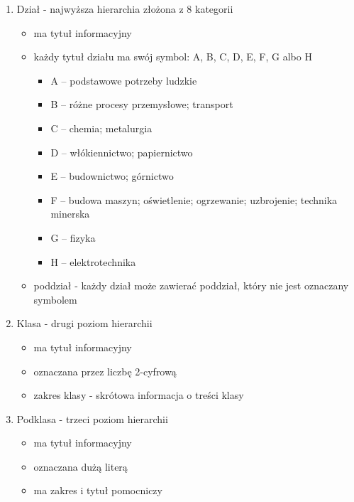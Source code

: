   \begin{enumerate}

\item Dział - najwyższa hierarchia złożona z 8 kategorii

  \begin{itemize}
\item ma tytuł informacyjny
\item każdy tytuł działu ma swój symbol: A, B, C, D, E, F, G albo H

  \begin{itemize}
\item A – podstawowe potrzeby ludzkie
\item B – różne procesy przemysłowe; transport
\item C – chemia; metalurgia
\item D – włókiennictwo; papiernictwo
\item E – budownictwo; górnictwo
\item F – budowa maszyn; oświetlenie; ogrzewanie; uzbrojenie; technika minerska
\item G – fizyka
\item H – elektrotechnika
\end{itemize}

\item poddział - każdy dział może zawierać poddział, który nie jest oznaczany symbolem
\end{itemize}



\item Klasa - drugi poziom hierarchii

  \begin{itemize}
\item ma tytuł informacyjny
\item oznaczana przez liczbę 2-cyfrową
\item zakres klasy - skrótowa informacja o treści klasy
\end{itemize}



\item Podklasa - trzeci poziom hierarchii

  \begin{itemize}
\item ma tytuł informacyjny
\item oznaczana dużą literą
\item ma zakres i tytuł pomocniczy
\end{itemize}




\end{enumerate}
